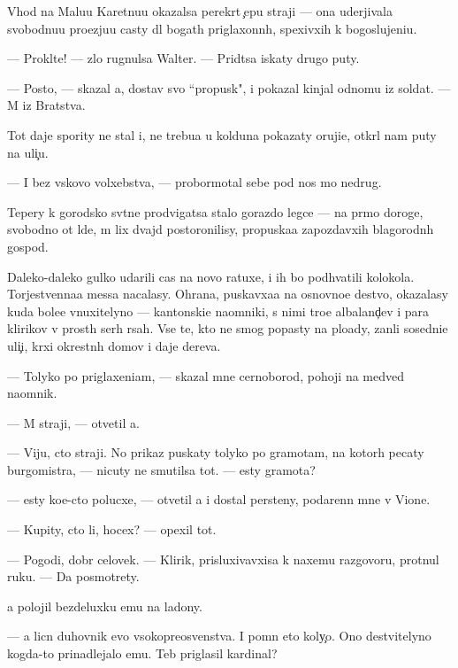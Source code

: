 \documentclass[10pt]{book}
\begin{document}
V{\yi}hod na Malu{\y}u Karetnu{\y}u okazalsa perekr{\yi}t {\c}ep{\y}u straji — ona uderjivala svobodnu{\y}u pro{\y}ezju{\y}u casty dl{\ia} bogat{\yi}h priglaxonn{\yi}h, spexivxih k bogoslujeni{\y}u.

— Prokl{\ia}t{\y}e! — zlo rugnulsa Walter. — Prid{\e}tsa iskaty drugo{\y} puty.

— Posto{\y}, — skazal {\y}a, dostav svo{\y} ``propusk", i pokazal kinjal odnomu iz soldat. — M{\yi} iz Bratstva.

Tot daje spority ne stal i, ne trebu{\y}a u kolduna pokazaty oruji{\y}e, otkr{\yi}l nam puty na uli{\c}u.

— I bez vs{\ia}kovo volxebstva, — probormotal sebe pod nos mo{\y} nedrug.

Tepery k gorodsko{\y} sv{\ia}t{\yi}ne prodvigatsa stalo gorazdo legce — na pr{\ia}mo{\y} doroge, svobodno{\y} ot l{\iu}de{\y}, m{\yi} lix dvajd{\yi} postoronilisy, propuska{\y}a zapozdavxih blagorodn{\yi}h gospod.

Daleko-daleko gulko udarili cas{\yi} na novo{\y} ratuxe, i ih bo{\y} podhvatili kolokola. Torjestvenna{\y}a messa nacalasy. Ohrana, puskavxa{\y}a na osnovno{\y}e de{\y}stvo, okazalasy kuda bole{\y}e vnuxitelyno{\y} — kantonski{\y}e na{\y}omniki, s nimi tro{\y}e albaland{\c}ev i para klirikov v prost{\yi}h ser{\yi}h r{\ia}sah. Vse te, kto ne smog popasty na plo{\x}ady, zan{\ia}li sosedni{\y}e uli{\c}i, kr{\yi}xi okrestn{\yi}h domov i daje derev{\y}a.

— Tolyko po priglaxeni{\y}am, — skazal mne cernoborod{\yi}{\y}, pohoji{\y} na medved{\ia} na{\y}omnik.

— M{\yi} straji, — otvetil {\y}a.

— Viju, cto straji. No prikaz puskaty tolyko po gramotam, na kotor{\yi}h pecaty burgomistra, — nicuty ne smutilsa tot. — {\Y}esty gramota?

— {\Y}esty ko{\y}e-cto polucxe, — otvetil {\y}a i dostal persteny, podarenn{\yi}{\y} mne v Vione.

— Kupity, cto li, hocex? — opexil tot.

— Pogodi, dobr{\yi}{\y} celovek. — Klirik, prisluxivavxi{\y}sa k naxemu razgovoru, prot{\ia}nul ruku. — Da{\y} posmotrety.

{\Y}a polojil bezdeluxku {\y}emu na ladony.

— {\Y}a licn{\yi}{\y} duhovnik {\y}evo v{\yi}sokopreosv{\ia}{\x}enstva. I pomn{\iu} eto koly{\c}o. Ono de{\y}stvitelyno kogda-to prinadlejalo {\y}emu. Teb{\ia} priglasil kardinal?
\end{document}
